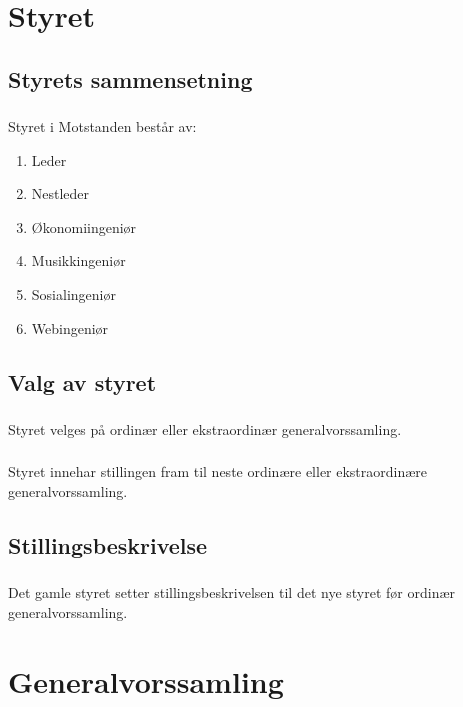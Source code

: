 \documentclass{article}
\newenvironment{statute}[1][]
    {
        \titleformat{\subsubsection}[runin]{\normalfont}{\hspace{1pt}\textit{\S\hspace{5pt}\thesubsubsection}}{0pt}{\rule{4pt}{0pt}}{}
        \subsubsection{}#1
        \begin{minipage}[t]{0.89\linewidth}
    }
    {
        \end{minipage}
        
        \ignorespacesafterend
    }
\begin{document}
    \section{Styret}
        \subsection{Styrets sammensetning}
            \begin{statute}
                Styret i Motstanden består av:
                \begin{enumerate}[font = \bfseries]
                    \item Leder
                    \item Nestleder
                    \item Økonomiingeniør
                    \item Musikkingeniør
                    \item Sosialingeniør
                    \item Webingeniør
                \end{enumerate}
            \end{statute}

        \subsection{Valg av styret}
            \begin{statute}
                Styret velges på ordinær eller ekstraordinær generalvorssamling.
            \end{statute}
            \begin{statute}
                Styret innehar stillingen fram til neste ordinære eller ekstraordinære generalvorssamling.
            \end{statute}
            
        \subsection{Stillingsbeskrivelse}
            \begin{statute}
                Det gamle styret setter stillingsbeskrivelsen til det nye styret før ordinær generalvorssamling.
            \end{statute}
            
    \section{Generalvorssamling}
\end{document}
